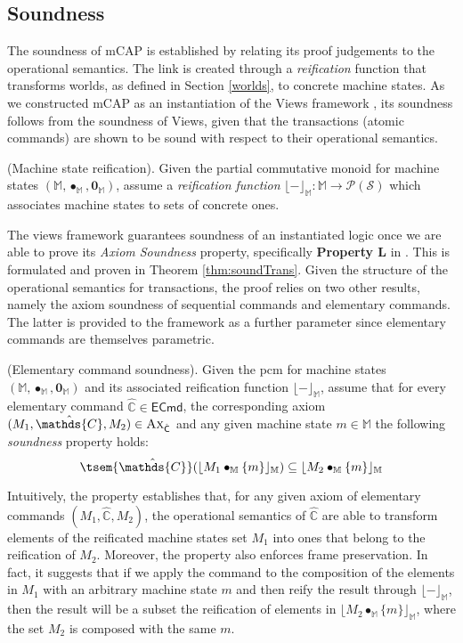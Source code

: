 \subsection{Soundness}

\label{sec:mcapSound}

The soundness of mCAP is established by relating its proof judgements to the operational semantics. The link is created through a \textit{reification} function that transforms worlds, as defined in Section \ref{worlds}, to concrete machine states. As we constructed mCAP as an instantiation of the Views framework \cite{views}, its soundness follows from the soundness of Views, given that the transactions (atomic commands) are shown to be sound with respect to their operational semantics.

\begin{param}
	(Machine state reification).
	Given the partial commutative monoid for machine states $(\mathbb{M}, \bullet_\mathbb{M}, \mathbf{0}_\mathbb{M})$, assume a \emph{reification function} $\lfloor - \rfloor_\mathbb{M} : \mathbb{M} \rightarrow \mathcal{P}(\mathcal{S})$ which associates machine states to sets of concrete ones.
\end{param}

The views framework guarantees soundness of an instantiated logic once we are able to prove its \textit{Axiom Soundness} property, specifically \textbf{Property L} in \cite{views}. This is formulated and proven in Theorem \ref{thm:soundTrans}. Given the structure of the operational semantics for transactions, the proof relies on two other results, namely the axiom soundness of sequential commands and elementary commands. The latter is provided to the framework as a further parameter since elementary commands are themselves parametric.

\begin{param}
	\label{param:ecmdSound}
	(Elementary command soundness).
	Given the pcm for machine states $(\mathbb{M}, \bullet_\mathbb{M}, \mathbf{0}_\mathbb{M})$ and its associated reification function $\lfloor - \rfloor_\mathbb{M}$, assume that for every elementary command $\hat{\mathds{C}} \in \mathsf{ECmd}$, the corresponding axiom $(M_1, \hat{\mathds{C}}, M_2) \in \textsc{Ax}_{\hat{\mathsf{C}}}$ and any given machine state $m \in \mathbb{M}$ the following \emph{soundness} property holds:
	\[
		\tsem{\hat{\mathds{C}}}(\lfloor M_1 \bullet_\mathbb{M} \{m\} \rfloor_\mathbb{M}) \subseteq \lfloor M_2 \bullet_\mathbb{M} \{m\} \rfloor_\mathbb{M}
	\]
\end{param}
Intuitively, the property establishes that, for any given axiom of elementary commands $(M_1, \hat{\mathds{C}}, M_2)$, the operational semantics of $\hat{\mathds{C}}$ are able to transform elements of the reificated machine states set $M_1$ into ones that belong to the reification of $M_2$. Moreover, the property also enforces frame preservation. In fact, it suggests that if we apply the command to the composition of the elements in $M_1$ with an arbitrary machine state $m$ and then reify the result through $\lfloor - \rfloor_\mathbb{M}$, then the result will be a subset the reification of elements in $\lfloor M_2 \bullet_\mathbb{M} \{ m \} \rfloor_\mathbb{M}$, where the set $M_2$ is composed with the same $m$.

